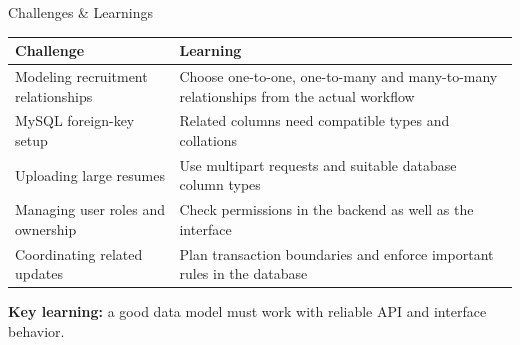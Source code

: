 \documentclass[aspectratio=169,11pt]{beamer}
\begin{document}
\begin{frame}{Challenges \& Learnings}
  \small
  \renewcommand{\arraystretch}{1.45}
  \begin{tabularx}{\textwidth}{|L{.34\textwidth}|Y|}
    \hline
    \textbf{Challenge} & \textbf{Learning}\\
    \hline
    Modeling recruitment relationships & Choose one-to-one, one-to-many and many-to-many relationships from the actual workflow\\
    \hline
    MySQL foreign-key setup & Related columns need compatible types and collations\\
    \hline
    Uploading large resumes & Use multipart requests and suitable database column types\\
    \hline
    Managing user roles and ownership & Check permissions in the backend as well as the interface\\
    \hline
    Coordinating related updates & Plan transaction boundaries and enforce important rules in the database\\
    \hline
  \end{tabularx}\par
  \par\vspace{3mm}
  \textbf{Key learning:} a good data model must work with reliable API and interface behavior.
\end{frame}
\end{document}
